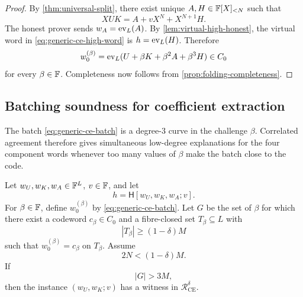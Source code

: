 \begin{proof}
By \cref{thm:universal-split}, there exist unique $A,H\in\mathbb{F}[X]_{<N}$ such that
\[
  XUK=A+vX^N+X^{N+1}H.
\]
The honest prover sends $w_A=\operatorname{ev}_L(A)$.  By \cref{lem:virtual-high-honest}, the virtual word in \eqref{eq:generic-ce-high-word} is $h=\operatorname{ev}_L(H)$.  Therefore
\[
  w_0^{(\beta)}
  =
  \operatorname{ev}_L(U+\beta K+\beta^2A+\beta^3H)
  \in C_0
\]
for every $\beta\in\mathbb{F}$.  Completeness now follows from \cref{prop:folding-completeness}.
\end{proof}

\subsection{Batching soundness for coefficient extraction}
\label{sec:generic-ce-batching}

The batch \eqref{eq:generic-ce-batch} is a degree-$3$ curve in the challenge $\beta$.  Correlated agreement therefore gives simultaneous low-degree explanations for the four component words whenever too many values of $\beta$ make the batch close to the code.

\begin{lemma}
\label{lem:generic-ce-batching}
Let $w_U,w_K,w_A\in\mathbb{F}^L$, $v\in\mathbb{F}$, and let
\[
  h=\mathsf H[w_U,w_K,w_A;v].
\]
For $\beta\in\mathbb{F}$, define $w_0^{(\beta)}$ by \eqref{eq:generic-ce-batch}.  Let $G$ be the set of $\beta$ for which there exist a codeword $c_\beta\in C_0$ and a fibre-closed set $T_\beta\subseteq L$ with
\[
  |T_\beta|\ge(1-\delta)M
\]
such that $w_0^{(\beta)}=c_\beta$ on $T_\beta$.  Assume
\begin{equation}
  2N<(1-\delta)M.
  \label{eq:generic-degree-margin}
\end{equation}
If
\[
  |G|>3M,
\]
then the instance $(w_U,w_K;v)$ has a witness in $\mathcal R^{\delta}_{\mathrm{CE}}$.
\end{lemma}

